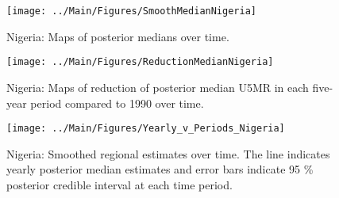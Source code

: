 \documentclass[12pt]{article}\usepackage[]{graphicx}\usepackage[]{color}
\newenvironment{knitrout}{}{} %
\begin{document}
\begin{knitrout}
\color{fgcolor}\begin{figure}[bht]

{\centering \texttt{[image: ../Main/Figures/SmoothMedianNigeria]} 

}

\caption[Nigeria]{Nigeria: Maps of posterior medians over time.}\label{fig:unnamed-chunk-264}
\end{figure}


\end{knitrout}
\begin{knitrout}
\color{fgcolor}\begin{figure}[bht]

{\centering \texttt{[image: ../Main/Figures/ReductionMedianNigeria]} 

}

\caption[Nigeria]{Nigeria: Maps of reduction of posterior median U5MR in each five-year period compared to 1990 over time.}\label{fig:unnamed-chunk-265}
\end{figure}


\end{knitrout}
\begin{knitrout}
\color{fgcolor}\begin{figure}[bht]

{\centering \texttt{[image: ../Main/Figures/Yearly\_v\_Periods\_Nigeria]} 

}

\caption[Nigeria]{Nigeria: Smoothed regional estimates over time. The line indicates yearly posterior median estimates and error bars indicate 95 \% posterior credible interval at each time period.}\label{fig:unnamed-chunk-266}
\end{figure}


\end{knitrout}
\end{document}
